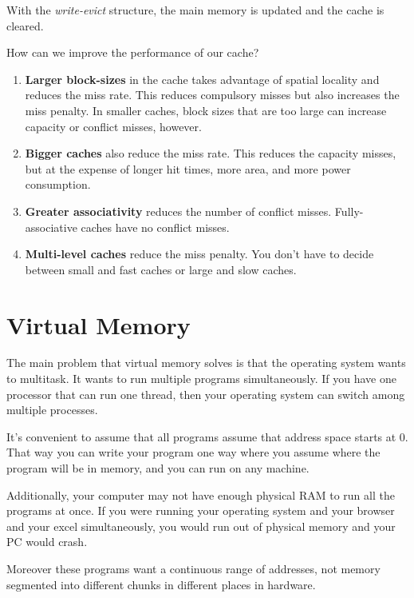 \documentclass{article}
\begin{document}
 With the \textit{write-evict} structure, the main memory is updated and the cache is cleared. 
 
How can we improve the performance of our cache?

\begin{enumerate}

\item \textbf{Larger block-sizes} in the cache  takes advantage of spatial locality and reduces the miss rate. This reduces compulsory misses but also increases the miss penalty. In smaller caches, block sizes that are too large can increase capacity or conflict misses, however. 

\item \textbf{Bigger caches} also reduce the miss rate. This reduces the capacity misses, but at the expense of longer hit times, more area, and more power consumption. 

\item \textbf{Greater associativity} reduces the number of conflict misses. Fully-associative caches have no conflict misses.

\item \textbf{Multi-level caches} reduce the miss penalty. You don't have to decide between small and fast caches or large and slow caches. 

\end{enumerate}


\clearpage
\section{Virtual Memory}

The main problem that virtual memory solves is that the operating system wants to multitask. It wants to run multiple programs simultaneously. If you have one processor that can run one thread, then your operating system can switch among multiple processes. 


It's convenient to assume that all programs assume that address space starts at 0. That way you can write your program one way where you assume where the program will be in memory, and you can run on any machine. 

Additionally, your computer may not have enough physical RAM to run all the programs at once. If you were running your operating system and your browser and your excel simultaneously, you would run out of physical memory and your PC would crash. 

Moreover these programs want a continuous range of addresses, not memory segmented into different chunks in different places in hardware. 
\end{document}

